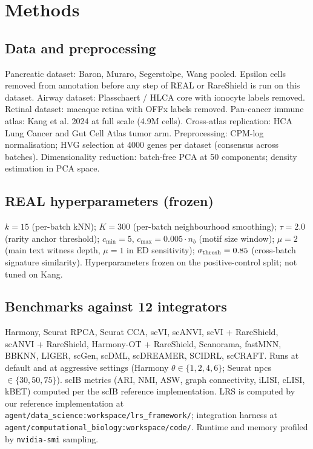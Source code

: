 \section{Methods}

\subsection{Data and preprocessing}

Pancreatic dataset: Baron, Muraro, Segerstolpe, Wang pooled.  Epsilon cells removed from annotation before any step of REAL or RareShield is run on this dataset.  Airway dataset: Plasschaert / HLCA core with ionocyte labels removed.  Retinal dataset: macaque retina with OFFx labels removed.  Pan-cancer immune atlas: Kang et al. 2024 at full scale (4.9M cells).  Cross-atlas replication: HCA Lung Cancer and Gut Cell Atlas tumor arm.  Preprocessing: CPM-log normalisation; HVG selection at 4000 genes per dataset (consensus across batches).  Dimensionality reduction: batch-free PCA at 50 components; density estimation in PCA space.

\subsection{REAL hyperparameters (frozen)}

$k=15$ (per-batch kNN); $K=300$ (per-batch neighbourhood smoothing); $\tau=2.0$ (rarity anchor threshold); $c_{\min}=5$, $c_{\max}=0.005\cdot n_b$ (motif size window); $\mu=2$ (main text witness depth, $\mu=1$ in ED sensitivity); $\sigma_{\rm thresh}=0.85$ (cross-batch signature similarity).  Hyperparameters frozen on the positive-control split; not tuned on Kang.











\subsection{Benchmarks against 12 integrators}

Harmony, Seurat RPCA, Seurat CCA, scVI, scANVI, scVI + RareShield, scANVI + RareShield, Harmony-OT + RareShield, Scanorama, fastMNN, BBKNN, LIGER, scGen, scDML, scDREAMER, SCIDRL, scCRAFT.  Runs at default and at aggressive settings (Harmony $\theta\in\{1,2,4,6\}$; Seurat npcs $\in \{30,50,75\}$).  scIB metrics (ARI, NMI, ASW, graph connectivity, iLISI, cLISI, kBET) computed per the scIB reference implementation.  LRS is computed by our reference implementation at \texttt{agent/data\_science:workspace/lrs\_framework/}; integration harness at \texttt{agent/computational\_biology:workspace/code/}.  Runtime and memory profiled by \texttt{nvidia-smi} sampling.

